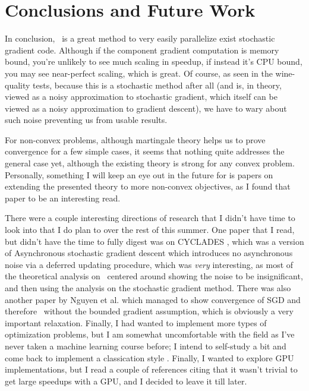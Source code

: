 \section{Conclusions and Future Work}\label{sec:conclusion}

In conclusion, \hogwild\ is a great method to very easily parallelize exist
stochastic gradient code. Although if the component gradient computation is
memory bound, you're unlikely to see much scaling in speedup, if instead it's
CPU bound, you may see near-perfect scaling, which is great. Of course, as seen
in the wine-quality tests, because this is a stochastic method after all (and
is, in theory, viewed as a noisy approximation to stochastic gradient, which
itself can be viewed as a noisy approximation to gradient descent), we have to
wary about such noise preventing us from usable results.

For non-convex problems, although martingale theory helps us to prove
convergence for a few simple cases, it seems that nothing quite addresses the
general case yet, although the existing theory is strong for any convex problem.
Personally, something I will keep an eye out in the future for is papers on
extending the presented theory to more non-convex objectives, as I found that
paper to be an interesting read.

There were a couple interesting directions of research that I didn't have time
to look into that I do plan to over the rest of this summer. One paper that
I read, but didn't have the time to fully digest was on CYCLADES
\cite{2016PLTPZJRRR}, which was a version of Asynchronous stochastic gradient
descent which introduces no asynchronous noise via a deferred updating
procedure, which was {\it very} interesting, as most of the theoretical analysis
on \hogwild\ centered around showing the noise to be insignificant, and then
using the analysis on the stochastic gradient method. There was also another
paper by Nguyen et al. \cite{2018NNDRST} which managed to show convergence of
SGD and therefore \hogwild\ without the bounded gradient assumption, which is
obviously a very important relaxation. Finally, I had wanted to implement more
types of optimization problems, but I am somewhat uncomfortable with the field
as I've never taken a machine learning course before; I intend to self-study
a bit and come back to implement a classication style \hogwild. Finally,
I wanted to explore GPU implementations, but I read a couple of references
citing that it wasn't trivial to get large speedups with a GPU, and I decided to
leave it till later.

